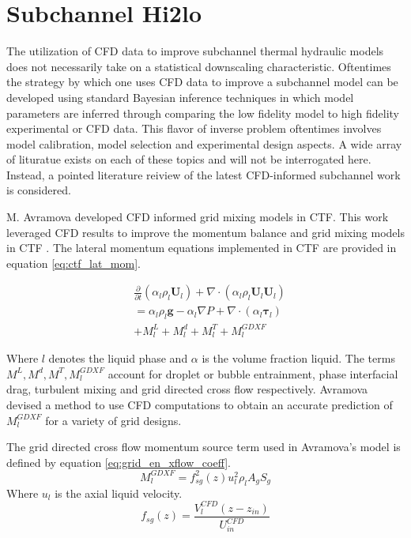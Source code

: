 \section{Subchannel Hi2lo}

The utilization of CFD data to improve subchannel thermal hydraulic models does not necessarily take on a statistical downscaling characteristic.  Oftentimes the strategy by which one uses CFD data to improve a subchannel model can be developed using standard Bayesian inference techniques in which model parameters are inferred through comparing the low fidelity model to high fidelity experimental or CFD data.  This flavor of inverse problem oftentimes involves  model calibration, model selection and experimental design aspects.  A wide array of lituratue exists on each of these topics and will not be interrogated here.  Instead, a pointed literature reiview of the latest CFD-informed subchannel work is considered.

 M. Avramova developed CFD informed grid mixing models in CTF.  This work leveraged CFD results to improve the momentum balance and grid mixing models in CTF \cite{avramova2007}.  The lateral momentum equations implemented in CTF are provided in equation \ref{eq:ctf_lat_mom}.

    	\begin{align}
    	& \frac{\partial }{\partial t}(\alpha_l \rho_l \mathbf U_l)
    	+ \nabla \cdot (\alpha_l \rho_l \mathbf U_l \mathbf U_l) \nonumber \\
    	&= \alpha_l \rho_l \mathbf{g} - \alpha_l \nabla P + 
    	\nabla \cdot (\alpha_l \bm{\tau}_l) \nonumber \\
    	&+ M^L_l + M^d_l + M^T_l + M_l^{GDXF}
        \label{eq:ctf_lat_mom}
    	\end{align}
        
Where $l$ denotes the liquid phase and $\alpha$ is the volume fraction liquid.  The terms $M^L, M^d, M^T, M_l^{GDXF}$ account for droplet or bubble entrainment, phase interfacial drag, turbulent mixing and grid directed cross flow respectively.  Avramova devised a method to use CFD computations to obtain an accurate prediction of $M_l^{GDXF}$ for a variety of grid designs.
    	
The grid directed cross flow momentum source term used in Avramova's model is defined by equation \ref{eq:grid_en_xflow_coeff}.
    	\begin{equation}
    	M_l^{GDXF} = f^2_{sg}(z) u_l^2 \rho_l A_g S_g
        \label{eq:grid_en_xflow_coeff}
    	\end{equation}
    	Where $u_l$ is the axial liquid velocity. 
    	\begin{equation}
    	f_{sg}(z) = \frac{V^{CFD}_l(z-z_{in})}{U^{CFD}_{in}}
    	\end{equation}
    	
